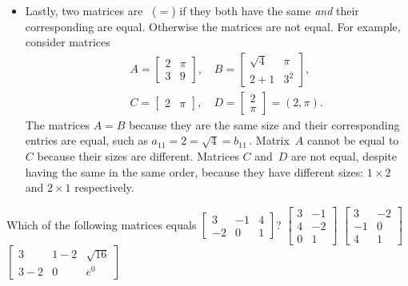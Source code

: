 \begin{itemize}
\item Lastly, two matrices are ~(\(=\)) if they both have the same  \emph{and} their corresponding  are equal.
Otherwise the matrices are not equal.
For example, consider matrices
\begin{eqnarray*}&&
A=\begin{bmatrix} 2&\pi\\3&9 \end{bmatrix},\quad
B=\begin{bmatrix} \sqrt4&\pi\\2+1&3^2 \end{bmatrix},\\&&
C=\begin{bmatrix} 2&\pi \end{bmatrix},\quad
D=\begin{bmatrix} 2\\\pi \end{bmatrix}=(2,\pi).
\end{eqnarray*}
The matrices \(A=B\) because they are the same size and their  corresponding entries are equal, such as \(a_{11}=2=\sqrt4=b_{11}\)\,.
Matrix~\(A\) cannot be equal to~\(C\) because their sizes are different.
Matrices \(C\) and~\(D\) are not equal, despite having the same  in the same order, because they have different sizes: \(1\times 2\) and \(2\times 1\) respectively.

\end{itemize}



\begin{activity}
Which of the following matrices equals \(\begin{bmatrix}  3&-1&4
\\-2&0&1\end{bmatrix}\)?
{\(\begin{bmatrix} 3&-1\\4
&-2\\0&1 \end{bmatrix}\)}
{\(\begin{bmatrix} 3&-2\\-1&0\\4&1 \end{bmatrix}\)}
{\(\begin{bmatrix} 3&1-2&\sqrt{16}
\\3-2&0&e^0 \end{bmatrix}\)}
\end{activity}







